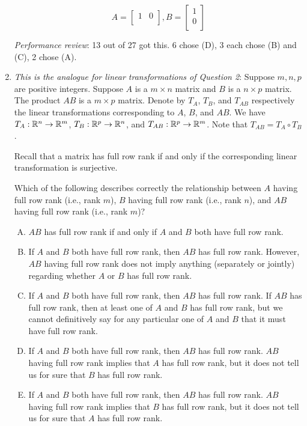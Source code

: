 \documentclass[10pt]{amsart}
\begin{document}
\begin{enumerate}
  $$A = \left[ \begin{matrix} 1 & 0 \\\end{matrix}\right], B = \left[\begin{matrix} 1 \\ 0 \\\end{matrix}\right]$$

  {\em Performance review}: 13 out of 27 got this. 6 chose (D), 3 each
  chose (B) and (C), 2 chose (A).

\item {\em This is the analogue for linear transformations of Question
  2}: Suppose $m,n,p$ are positive integers. Suppose $A$ is a $m
  \times n$ matrix and $B$ is a $n \times p$ matrix. The product $AB$
  is a $m \times p$ matrix. Denote by $T_A$, $T_B$, and $T_{AB}$
  respectively the linear transformations corresponding to $A$, $B$,
  and $AB$. We have $T_A:\mathbb{R}^n \to \mathbb{R}^m$, $T_B: \mathbb{R}^p \to \mathbb{R}^n$, and
  $T_{AB}: \mathbb{R}^p \to \mathbb{R}^m$. Note that $T_{AB} = T_A \circ T_B$.

  Recall that a matrix has full row rank if and only if the
  corresponding linear transformation is surjective.

  Which of the following describes correctly the relationship between
  $A$ having full row rank (i.e., rank $m$), $B$ having full row rank
  (i.e., rank $n$), and $AB$ having full row rank (i.e., rank $m$)?

  \begin{enumerate}[(A)]
  \item $AB$ has full row rank if and only if $A$ and $B$ both have
    full row rank.
  \item If $A$ and $B$ both have full row rank, then $AB$ has full row
    rank. However, $AB$ having full row rank does not imply anything
    (separately or jointly) regarding whether $A$ or $B$ has full row
    rank.
  \item If $A$ and $B$ both have full row rank, then $AB$ has full
    row rank. If $AB$ has full row rank, then at least one of
    $A$ and $B$ has full row rank, but we cannot definitively say
    for any particular one of $A$ and $B$ that it must have full row
    rank.
  \item If $A$ and $B$ both have full row rank, then $AB$ has full
    row rank. $AB$ having full row rank implies that $A$ has
    full row rank, but it does not tell us for sure that $B$ has
    full row rank.
  \item If $A$ and $B$ both have full row rank, then $AB$ has full
    row rank. $AB$ having full row rank implies that $B$ has
    full row rank, but it does not tell us for sure that $A$ has
    full row rank.
  \end{enumerate}


\end{enumerate}
\end{document}
